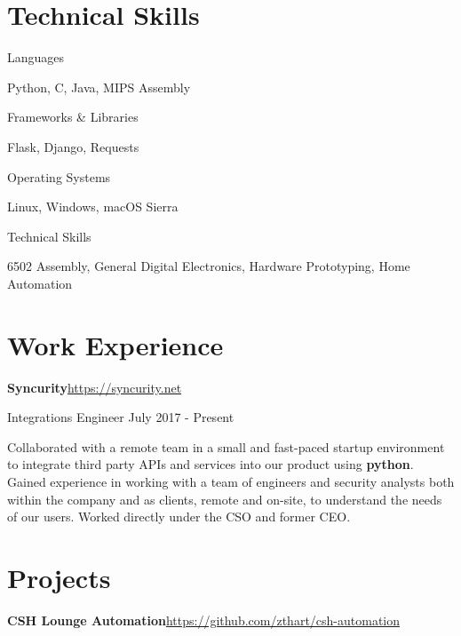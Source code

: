 \documentclass[margin,line]{resume}
\newcommand{\rurl}[1]{\hfill {\footnotesize \url{#1}}}
\begin{document}
\begin{resume}
\section{\mysidestyle Technical Skills}
	\begin{compactdesc}
		\item[Languages] \begin{inparaenum} { \small
			Python, C, Java, MIPS Assembly
		} \end{inparaenum}
        \item[Frameworks \& Libraries] \begin{inparaenum} { \small
        	Flask, Django, Requests
        } \end{inparaenum}
		\item[Operating Systems] \begin{inparaenum} { \small
			Linux, Windows, macOS Sierra
		} \end{inparaenum}
        \item[Technical Skills] \begin{inparaenum} { \small
			6502 Assembly, General Digital Electronics, Hardware Prototyping, Home Automation
        } \end{inparaenum}
        \normalsize
	\end{compactdesc}

\section{\mysidestyle Work Experience}
	\begin{asparablank}
		\item{\bf Syncurity}\rurl{https://syncurity.net}
		\small \item Integrations Engineer \hfill July 2017 - Present
		\linebreak

		\small Collaborated with a remote team in a small and fast-paced startup environment to integrate third party APIs and services into our product using \textbf{python}.
		\small Gained experience in working with a team of engineers and security analysts both within the company and as clients, remote and on-site, to understand the needs of our users.
		\small Worked directly under the CSO and former CEO.
	\end{asparablank}

\section{\mysidestyle Projects}
	\begin{asparablank}
		\item {\bf CSH Lounge Automation}\rurl{https://github.com/zthart/csh-automation}


\end{asparablank}
\end{resume}
\end{document}
